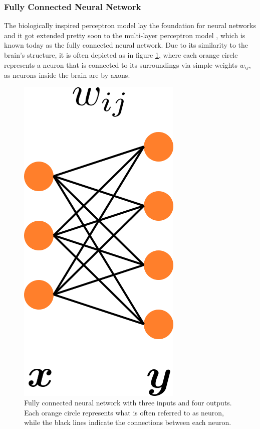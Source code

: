 \subsubsection{Fully Connected Neural Network}
The biologically inspired perceptron model \cite{viglione19704} lay the foundation for neural networks and it got extended pretty soon to the multi-layer perceptron model
\cite{ivakhnenko1971polynomial}, which is known today as the fully connected neural network. Due to its similarity to the brain's structure, it is often depicted as in figure \ref{fig::321_fully_connected}, where each orange circle represents a neuron that is connected to its surroundings via simple weights $w_{ij}$, as neurons inside the brain are by axons.
\begin{figure}[h]
	\centering
	\includegraphics[scale=.28]{chapters/03_background/img/fully_connected.png}
	\caption{Fully connected neural network with three inputs and four outputs. Each orange circle represents what is often referred to as neuron, while the black lines indicate the connections between each neuron.}
	\label{fig::321_fully_connected}
\end{figure}

